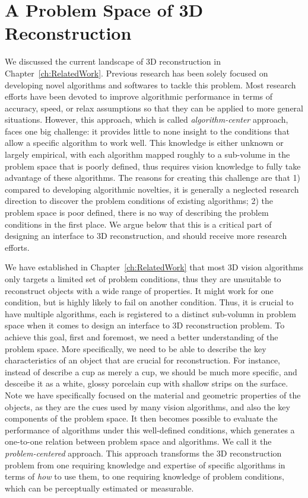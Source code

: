 
\chapter{A Problem Space of 3D Reconstruction}
\label{ch:3DRecon_ProbSpace}
We discussed the current landscape of 3D reconstruction in Chapter~\ref{ch:RelatedWork}. Previous research has been solely focused on developing novel algorithms and softwares to tackle this problem. Most research efforts have been devoted to improve algorithmic performance in terms of accuracy, speed, or relax assumptions so that they can be applied to more general situations. However, this approach, which is called \textit{algorithm-center} approach, faces one big challenge: it provides little to none insight to the conditions that allow a specific algorithm to work well. This knowledge is either unknown or largely empirical, with each algorithm mapped roughly to a sub-volume in the problem space that is poorly defined, thus requires vision knowledge to fully take advantage of these algorithms. The reasons for creating this challenge are that 1) compared to developing algorithmic novelties, it is generally a neglected research direction to discover the problem conditions of existing algorithms; 2) the problem space is poor defined, there is no way of describing the problem conditions in the first place. We argue below that this is a critical part of designing an interface to 3D reconstruction, and should receive more research efforts. 

We have established in Chapter~\ref{ch:RelatedWork} that most 3D vision algorithms only targets a limited set of problem conditions, thus they are unsuitable to reconstruct objects with a wide range of properties. It might work for one condition, but is highly likely to fail on another condition. Thus, it is crucial to have multiple algorithms, each is registered to a distinct sub-volumn in problem space when it comes to design an interface to 3D reconstruction problem. To achieve this goal, first and foremost, we need a better understanding of the problem space. More specifically, we need to be able to describe the key characteristics of an object that are crucial for reconstruction. For instance, instead of describe a cup as merely a cup, we should be much more specific, and desceibe it as a white, glossy porcelain cup with shallow strips on the surface. Note we have specifically focused on the material and geometric properties of the objects, as they are the cues used by many vision algorithms, and also the key components of the problem space. It then becomes possible to evaluate the performance of algorithms under this well-defined conditions, which generates a one-to-one relation between problem space and algorithms. We call it the \textit{problem-centered} approach. This approach transforms the 3D reconstruction problem from one requiring knowledge and expertise of specific algorithms in terms of \textit{how} to use them, to one requiring knowledge of problem conditions, which can be perceptually estimated or measurable.

